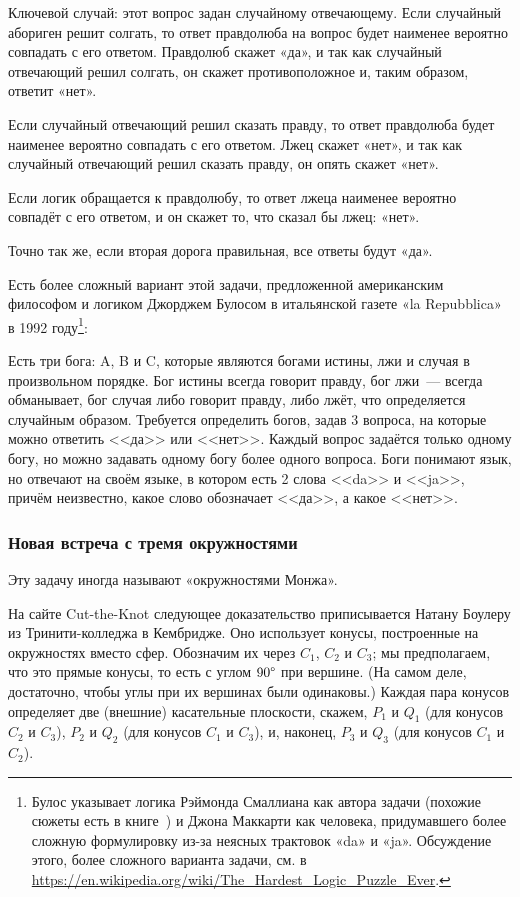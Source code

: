 Ключевой случай: этот вопрос задан случайному отвечающему.
Если случайный абориген решит солгать, то ответ правдолюба на вопрос будет наименее вероятно совпадать с его ответом.
Правдолюб скажет «да», и так как случайный отвечающий решил солгать, он скажет противоположное и, таким образом, ответит «нет».

Если случайный отвечающий решил сказать правду, то ответ правдолюба будет наименее вероятно совпадать с его ответом.
Лжец скажет «нет», и так как случайный отвечающий решил сказать правду, он опять скажет «нет».

Если логик обращается к правдолюбу, то ответ лжеца наименее вероятно совпадёт с его ответом, и он скажет то, что сказал бы лжец: «нет».

Точно так же, если вторая дорога правильная, все ответы будут «да».

\begin{addedbytheeditors}
Есть более сложный вариант этой задачи, предложенной американским философом и логиком Джорджем Булосом в итальянской газете «la Repubblica» в 1992 году\footnote{Булос указывает логика Рэймонда Смаллиана как автора задачи (похожие сюжеты есть в книге~\cite{52}) и Джона Маккарти как человека, придумавшего более сложную формулировку из-за неясных трактовок «da» и «ja».   
Обсуждение этого, более сложного варианта задачи, см. в
\href{https://en.wikipedia.org/wiki/The_Hardest_Logic_Puzzle_Ever}{https://en.wikipedia.org/wiki/The_Hardest_Logic_Puzzle_Ever}.}:

Есть три бога: A, B и C, которые являются богами истины, лжи и случая в произвольном порядке.
Бог истины всегда говорит правду, бог лжи~--- всегда обманывает, бог случая либо говорит правду, либо лжёт, что определяется случайным образом. Требуется определить богов, задав 3 вопроса, на которые можно ответить <<да>> или <<нет>>. Каждый вопрос задаётся только одному богу, но можно задавать одному богу более одного вопроса. Боги понимают язык, но отвечают на своём языке, в котором есть 2 слова <<da>> и <<ja>>, причём неизвестно, какое слово обозначает <<да>>, а какое <<нет>>.\pr
\end{addedbytheeditors}

\subsubsection*{Новая встреча с тремя окружностями}

Эту задачу иногда называют «окружностями Монжа».

На сайте Cut-the-Knot \cite{cut-the-knot} следующее доказательство приписывается Натану Боулеру из Тринити-колледжа в Кембридже.
Оно использует конусы, построенные на окружностях вместо сфер.
Обозначим их через $C_1$, $C_2$ и $C_3$; мы предполагаем, что это прямые конусы, то есть с углом $90\degree$ при вершине.
(На самом деле, достаточно, чтобы углы при их вершинах были одинаковы.)
Каждая пара конусов определяет две (внешние) касательные плоскости, скажем, $P_1$ и $Q_1$ (для конусов $C_2$ и $C_3$), $P_2$ и $Q_2$ (для конусов $C_1$ и $C_3$), и, наконец, $P_3$ и $Q_3$ (для конусов $C_1$ и $C_2$).

